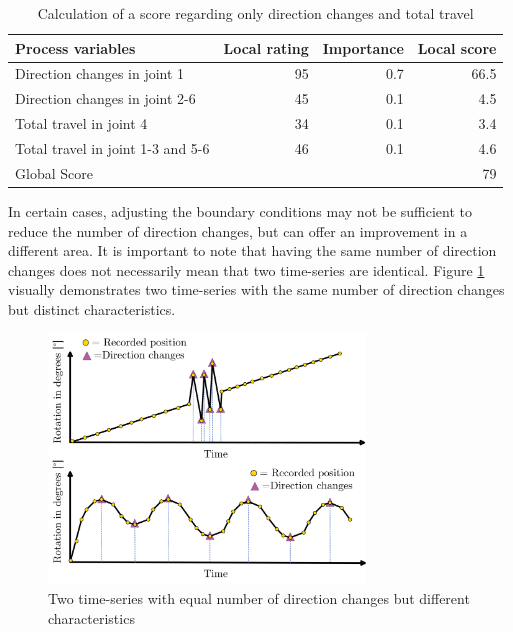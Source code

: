 \begin{table}[H]
	\centering
	\begin{tabular}{||l|r|r|r||}
		Process variables & Local rating & Importance & Local score\\
		\hline
		\hline
		\hline
		
		Direction changes in joint 1 & 95 & 0.7 & 66.5\\
		Direction changes in joint 2-6 & 45& 0.1&4.5\\
		Total travel in joint 4& 34& 0.1&3.4\\
		Total travel in joint 1-3 and 5-6& 46&0.1&4.6\\
		\hline
		\hline
		\hline
		Global Score& & &79\\
		\hline
		\hline
	\end{tabular}
	
	\caption{Calculation of a score regarding only direction changes and total travel}
	\label{exampleDirTravel}
\end{table}


In certain cases, adjusting the boundary conditions may not be sufficient to reduce the number of direction changes, but can offer an improvement in a different area. It is important to note that having the same number of direction changes does not necessarily mean that two time-series are identical. Figure \ref{dirchangeSTD} visually demonstrates two time-series with the same number of direction changes but distinct characteristics.

\begin{figure}[H]
	\centerline{\includegraphics[width=0.75\textwidth]{figures/DirSTD.png}}
	\caption{Two time-series with equal number of direction changes but different characteristics}
	\label{dirchangeSTD}
\end{figure}

